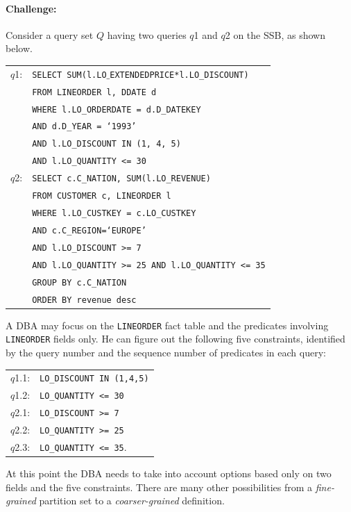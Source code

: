 \documentclass[runningheads]{comsis2}
\begin{document}
\paragraph{Challenge:}
Consider a query set $Q$ having two queries $q$1 and $q$2 on the SSB, as shown below.
\vspace{-.05in}
\begin{center}
{\small
\begin{tabular}{rl}
$q$1:	& {\tt SELECT SUM(l.LO$\_$EXTENDEDPRICE*l.LO\_DISCOUNT)} \\ 
		& {\tt FROM LINEORDER l, DDATE d} \\
		& {\tt WHERE l.LO\_ORDERDATE = d.D\_DATEKEY} \\
		& {\tt AND d.D\_YEAR = `1993'} \\
		& {\tt AND l.LO\_DISCOUNT IN (1, 4, 5)} \\
        & {\tt AND l.LO\_QUANTITY <= 30} \\ 
$q$2:	& {\tt SELECT c.C\_NATION, SUM(l.LO\_REVENUE)} \\ 
		& {\tt FROM CUSTOMER c, LINEORDER l} \\
		& {\tt WHERE l.LO\_CUSTKEY = c.LO\_CUSTKEY} \\
		& {\tt AND c.C\_REGION=`EUROPE'} \\
		& {\tt AND l.LO\_DISCOUNT >= 7} \\
		& {\tt AND l.LO\_QUANTITY >= 25 AND l.LO\_QUANTITY <= 35} \\
		& {\tt GROUP BY c.C\_NATION} \\
		& {\tt ORDER BY revenue desc} \\
\end{tabular}
}
\vspace{-.01in}
\end{center}

A DBA may focus on the {\tt LINEORDER} fact table and 
the predicates involving {\tt LINEORDER} fields only. 
He can figure out the following five constraints, identified by the query number 
and the sequence number of predicates in each query: 
\vspace{-.05in}
\begin{center}
\begin{tabular}{cl}
$q$1.1: & {\tt LO\_DISCOUNT IN (1,4,5)} \\ 
$q$1.2: & {\tt LO\_QUANTITY <= 30} \\ 
$q$2.1: & {\tt LO\_DISCOUNT >= 7} \\ 
$q$2.2: & {\tt LO\_QUANTITY >= 25}\\ 
$q$2.3: & {\tt LO\_QUANTITY <= 35}. \\ 
\end{tabular}
\end{center}
\vspace{-.05in}
At this point the DBA needs to take into account options 
based only on two fields and the five constraints. 
There are many other possibilities from a {\em fine-grained} partition set 
to a {\em coarser-grained} definition. 
\end{document}
